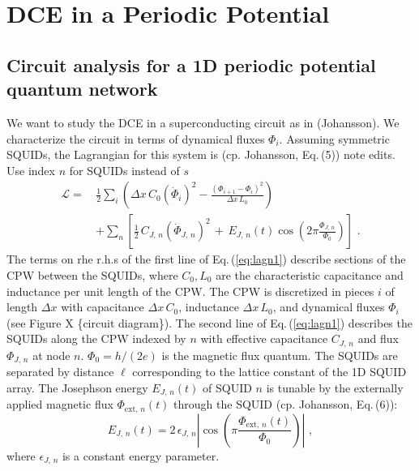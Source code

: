 \chapter{DCE in a Periodic Potential} %


\section{Circuit analysis for a 1D periodic potential quantum network}\label{sec:circ_an}
We want to study the DCE in a superconducting circuit as in (Johansson). We characterize the circuit in terms of dynamical fluxes $\Phi_i$. \color{blue} Assuming symmetric SQUIDs, the Lagrangian for this system is (cp. Johansson, Eq.\,(5))
\color{red} note edits. Use index $n$ for SQUIDs instead of $s$ \color{blue}
%
\begin{equation} \label{eq:lagn1}
\begin{split}
\mathcal{L} = \, & \frac{1}{2} \sum_i \left( \Delta x \, C_{0} \left(\dot{\Phi}_{i}\right)^{2} - 
\frac{\left(\Phi_{i+1}-\Phi_{i}\right)^{2}}{\Delta x \, L_{0}} \right)  \\[2mm]
& + \sum_n \left[ \frac{1}{2} \, C_{J,\,n} \left(\dot{\Phi}_{J,\,n} \right)^{2} \, + \, 
E_{J,\,n}(t) \cos\left(2\pi \frac{\Phi_{J,\,n}}{\Phi_0} \right) \right] \, \, .
\end{split}
\end{equation}
%
The terms on rhe r.h.s of the first line of Eq.\,(\ref{eq:lagn1}) describe sections of the CPW between the SQUIDs, where
$C_0, L_0$ are the characteristic capacitance and inductance per unit length of the CPW. 
The CPW is discretized in pieces $i$ of length $\Delta x$ with capacitance $\Delta x \, C_0$, 
inductance $\Delta x \, L_0$, and dynamical fluxes $\Phi_i$ \color{red}(see Figure X \{circuit diagram\})\color{blue}.   
The second line of Eq.\,(\ref{eq:lagn1}) describes the SQUIDs along the CPW indexed by $n$ 
with effective capacitance $C_{J,\,n}$ and flux $\Phi_{J,\,n}$ at node $n$. 
$\Phi_0 = h / (2 e)$ is the magnetic flux quantum.
The SQUIDs are separated by 
distance $\ell$ corresponding to the lattice constant of the 1D SQUID array. 
The Josephson energy $E_{J,\,n}(t)$ of SQUID $n$ is tunable
by the externally applied magnetic flux $\Phi_{\text{ext},\,n}(t)$ through the SQUID 
(cp. Johansson, Eq.\,(6)): 
%
\begin{equation} \label{eq:squidenergy}
    E_{J,\,n}(t) = 2 \, \epsilon_{J,\,n} 
    \left\vert \cos\left(\pi \frac{\Phi_{\text{ext},\,n}(t)}{\Phi_0}\right)\right\vert \, \, ,
\end{equation}
%
where $\epsilon_{J,\,n}$ is a constant energy parameter.


